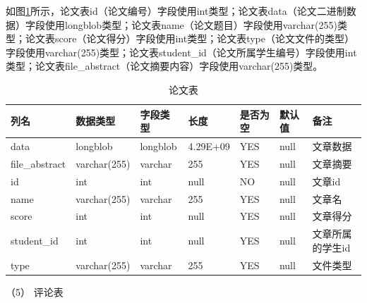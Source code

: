 如图\ref{db-file}所示，论文表id（论文编号）字段使用int类型；论文表data（论文二进制数据）字段使用longblob类型；论文表name（论文题目）字段使用varchar(255)类型；论文表score（论文得分）字段使用int类型；论文表type（论文文件的类型）字段使用varchar(255)类型；论文表student\_id（论文所属学生编号）字段使用int类型；论文表file\_abstract（论文摘要内容）字段使用varchar(255)类型。
\begin{table}[htbp]
    \centering
    \song\wuhao
    \caption{论文表}
    \label{db-file}
    \begin{tabular}{lllllll}
        \hline
        列名           & 数据类型     & 字段类型 & 长度     & 是否为空 & 默认值 & 备注             \\ \hline
        data           & longblob     & longblob & 4.29E+09 & YES      & null   & 文章数据         \\
        file\_abstract & varchar(255) & varchar  & 255      & YES      & null   & 文章摘要         \\
        id             & int          & int      & null     & NO       & null   & 文章id           \\
        name           & varchar(255) & varchar  & 255      & YES      & null   & 文章名           \\
        score          & int          & int      & null     & YES      & null   & 文章得分         \\
        student\_id    & int          & int      & null     & YES      & null   & 文章所属的学生id \\
        type           & varchar(255) & varchar  & 255      & YES      & null   & 文件类型         \\ \hline
    \end{tabular}
\end{table}

（5）  评论表

